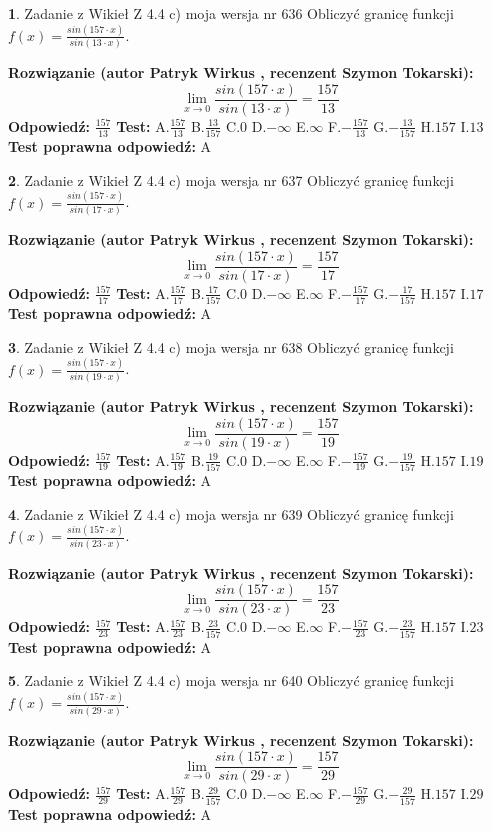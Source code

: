\documentclass[12pt, a4paper]{article}
\theoremstyle{definition} %
\newtheorem{zad}{}
\newcommand{\zadStart}[1]{\begin{zad}#1\newline}
\newcommand{\zadStop}{\end{zad}}
\newcommand{\rozwStart}[2]{\noindent \textbf{Rozwiązanie (autor #1 , recenzent #2): }\newline}
\newcommand{\rozwStop}{\newline}
\newcommand{\odpStart}{\noindent \textbf{Odpowiedź:}\newline}
\newcommand{\odpStop}{\newline}
\newcommand{\testStart}{\noindent \textbf{Test:}\newline}
\newcommand{\testStop}{\newline}
\newcommand{\kluczStart}{\noindent \textbf{Test poprawna odpowiedź:}\newline}
\newcommand{\kluczStop}{\newline}
\begin{document}
\zadStart{Zadanie z Wikieł Z 4.4 c) moja wersja nr 636}
Obliczyć granicę funkcji $f(x)=\frac{sin(157\cdot x)}{sin(13\cdot x)}$.
\zadStop
\rozwStart{Patryk Wirkus}{Szymon Tokarski}
$$\lim\limits_{x\to 0}\frac{sin(157\cdot x)}{sin(13\cdot x)}=
\frac{157}{13}$$
\rozwStop
\odpStart
$\frac{157}{13}$
\odpStop
\testStart
A.$\frac{157}{13}$
B.$\frac{13}{157}$
C.$0$
D.$-\infty$
E.$\infty$
F.$-\frac{157}{13}$
G.$-\frac{13}{157}$
H.$157$
I.$13$
\testStop
\kluczStart
A
\kluczStop



\zadStart{Zadanie z Wikieł Z 4.4 c) moja wersja nr 637}
Obliczyć granicę funkcji $f(x)=\frac{sin(157\cdot x)}{sin(17\cdot x)}$.
\zadStop
\rozwStart{Patryk Wirkus}{Szymon Tokarski}
$$\lim\limits_{x\to 0}\frac{sin(157\cdot x)}{sin(17\cdot x)}=
\frac{157}{17}$$
\rozwStop
\odpStart
$\frac{157}{17}$
\odpStop
\testStart
A.$\frac{157}{17}$
B.$\frac{17}{157}$
C.$0$
D.$-\infty$
E.$\infty$
F.$-\frac{157}{17}$
G.$-\frac{17}{157}$
H.$157$
I.$17$
\testStop
\kluczStart
A
\kluczStop



\zadStart{Zadanie z Wikieł Z 4.4 c) moja wersja nr 638}
Obliczyć granicę funkcji $f(x)=\frac{sin(157\cdot x)}{sin(19\cdot x)}$.
\zadStop
\rozwStart{Patryk Wirkus}{Szymon Tokarski}
$$\lim\limits_{x\to 0}\frac{sin(157\cdot x)}{sin(19\cdot x)}=
\frac{157}{19}$$
\rozwStop
\odpStart
$\frac{157}{19}$
\odpStop
\testStart
A.$\frac{157}{19}$
B.$\frac{19}{157}$
C.$0$
D.$-\infty$
E.$\infty$
F.$-\frac{157}{19}$
G.$-\frac{19}{157}$
H.$157$
I.$19$
\testStop
\kluczStart
A
\kluczStop



\zadStart{Zadanie z Wikieł Z 4.4 c) moja wersja nr 639}
Obliczyć granicę funkcji $f(x)=\frac{sin(157\cdot x)}{sin(23\cdot x)}$.
\zadStop
\rozwStart{Patryk Wirkus}{Szymon Tokarski}
$$\lim\limits_{x\to 0}\frac{sin(157\cdot x)}{sin(23\cdot x)}=
\frac{157}{23}$$
\rozwStop
\odpStart
$\frac{157}{23}$
\odpStop
\testStart
A.$\frac{157}{23}$
B.$\frac{23}{157}$
C.$0$
D.$-\infty$
E.$\infty$
F.$-\frac{157}{23}$
G.$-\frac{23}{157}$
H.$157$
I.$23$
\testStop
\kluczStart
A
\kluczStop



\zadStart{Zadanie z Wikieł Z 4.4 c) moja wersja nr 640}
Obliczyć granicę funkcji $f(x)=\frac{sin(157\cdot x)}{sin(29\cdot x)}$.
\zadStop
\rozwStart{Patryk Wirkus}{Szymon Tokarski}
$$\lim\limits_{x\to 0}\frac{sin(157\cdot x)}{sin(29\cdot x)}=
\frac{157}{29}$$
\rozwStop
\odpStart
$\frac{157}{29}$
\odpStop
\testStart
A.$\frac{157}{29}$
B.$\frac{29}{157}$
C.$0$
D.$-\infty$
E.$\infty$
F.$-\frac{157}{29}$
G.$-\frac{29}{157}$
H.$157$
I.$29$
\testStop
\kluczStart
A
\kluczStop
\end{document}
